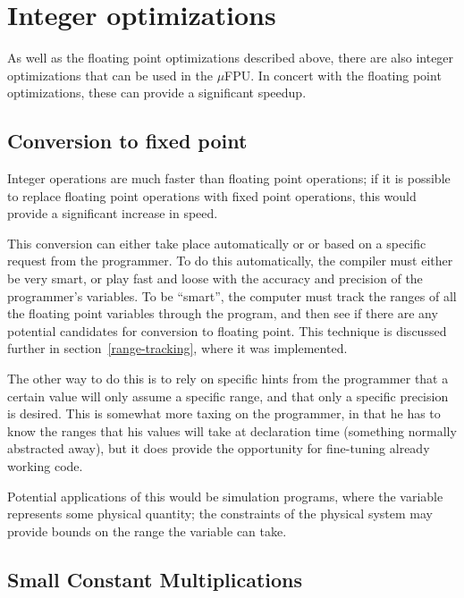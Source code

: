 \section{Integer optimizations}

As well as the floating point optimizations described above, there are
also integer optimizations that can be used in the $\mu$FPU.  In concert
with the floating point optimizations, these can provide a significant
speedup.  

\subsection{Conversion to fixed point}

Integer operations are much faster than floating point operations; if it is
possible to replace floating point operations with fixed point operations,
this would provide a significant increase in speed.

This conversion can either take place automatically or or based on a
specific request from the programmer.  To do this automatically, the
compiler must either be very smart, or play fast and loose with the accuracy
and precision of the programmer's variables.  To be ``smart'', the computer
must track the ranges of all the floating point variables through the
program, and then see if there are any potential candidates for conversion
to floating point.  This technique is discussed further in
section~\ref{range-tracking}, where it was implemented.

The other way to do this is to rely on specific hints from the programmer
that a certain value will only assume a specific range, and that only a
specific precision is desired.  This is somewhat more taxing on the
programmer, in that he has to know the ranges that his values will take at
declaration time (something normally abstracted away), but it does provide
the opportunity for fine-tuning already working code.

Potential applications of this would be simulation programs, where the
variable represents some physical quantity; the constraints of the physical
system may provide bounds on the range the variable can take.
\subsection{Small Constant Multiplications}

